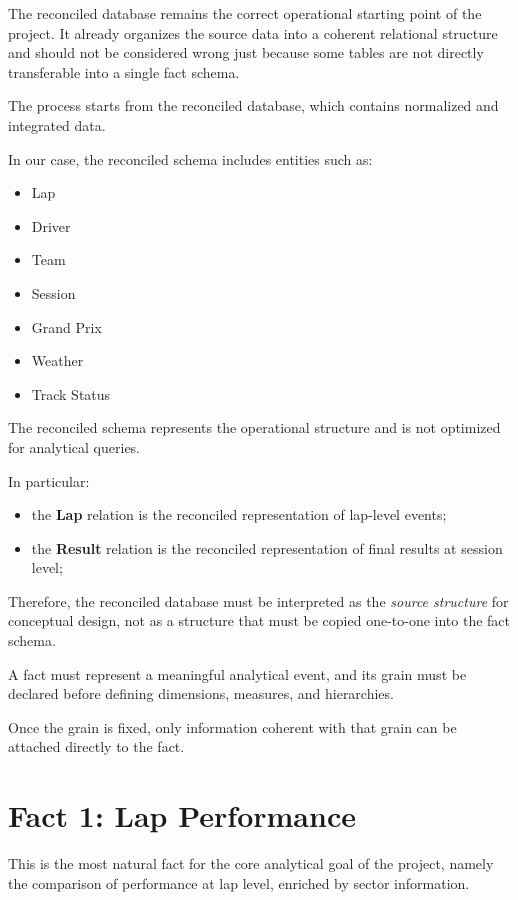 \documentclass[a4paper,11pt]{article}
\begin{document}
	The reconciled database remains the correct operational starting point of the project. It already organizes the source data into a coherent relational structure and should not be considered wrong just because some tables are not directly transferable into a single fact schema.
	
	
	The process starts from the reconciled database, which contains normalized and integrated data.
	
	In our case, the reconciled schema includes entities such as:
	\begin{itemize}
		\item Lap
		\item Driver
		\item Team
		\item Session
		\item Grand Prix
		\item Weather
		\item Track Status
	\end{itemize}
	
	The reconciled schema represents the operational structure and is not optimized for analytical queries.
	
	In particular:
	\begin{itemize}[leftmargin=1.5em]
		\item the \textbf{Lap} relation is the reconciled representation of lap-level events;
		\item the \textbf{Result} relation is the reconciled representation of final results at session level;
	\end{itemize}
	
	Therefore, the reconciled database must be interpreted as the \emph{source structure} for conceptual design, not as a structure that must be copied one-to-one into the fact schema.
	

	A fact must represent a meaningful analytical event, and its grain must be declared before defining dimensions, measures, and hierarchies.
	
	Once the grain is fixed, only information coherent with that grain can be attached directly to the fact.
	
	
	\section{Fact 1: Lap Performance}
	
	This is the most natural fact for the core analytical goal of the project, namely the comparison of performance at lap level, enriched by sector information.
	
\end{document}
